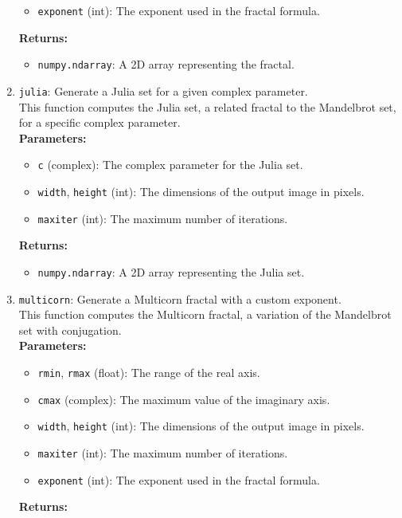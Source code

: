 \documentclass{article}
\begin{document}
\begin{enumerate}
\begin{itemize}
        \item \texttt{exponent} (int): The exponent used in the fractal formula.
    \end{itemize}
    \textbf{Returns:}
    \begin{itemize}
        \item \texttt{numpy.ndarray}: A 2D array representing the fractal.
    \end{itemize}
    \item \texttt{julia}: Generate a Julia set for a given complex parameter.\\
    This function computes the Julia set, a related fractal to the Mandelbrot set, for a specific complex parameter.\\
    \textbf{Parameters:}
    \begin{itemize}
        \item \texttt{c} (complex): The complex parameter for the Julia set.
        \item \texttt{width}, \texttt{height} (int): The dimensions of the output image in pixels.
        \item \texttt{maxiter} (int): The maximum number of iterations.
    \end{itemize}
    \textbf{Returns:}
    \begin{itemize}
        \item \texttt{numpy.ndarray}: A 2D array representing the Julia set.
    \end{itemize}
    \item \texttt{multicorn}: Generate a Multicorn fractal with a custom exponent.\\
    This function computes the Multicorn fractal, a variation of the Mandelbrot set with conjugation.\\
    \textbf{Parameters:}
    \begin{itemize}
        \item \texttt{rmin}, \texttt{rmax} (float): The range of the real axis.
        \item \texttt{cmax} (complex): The maximum value of the imaginary axis.
        \item \texttt{width}, \texttt{height} (int): The dimensions of the output image in pixels.
        \item \texttt{maxiter} (int): The maximum number of iterations.
        \item \texttt{exponent} (int): The exponent used in the fractal formula.
    \end{itemize}
    \textbf{Returns:}

\end{enumerate}
\end{document}
